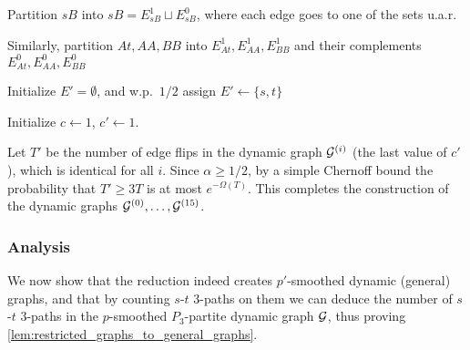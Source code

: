 \documentclass[letter,11pt]{article}
\newcommand{\paths}[3]{${#1}$-${#2}$ ${#3}$-paths\xspace}
\newcommand{\ptg}{\textsc{P3toGeneral}\xspace}
\begin{document}
\begin{algorithm}[H]\DontPrintSemicolon
	\caption{Algorithm \ptg for counting paths in a general graph by counting them in $P_3$-partite graphs}
	
	\nl
	Partition $sB$ into $sB= E_{sB}^1 \sqcup E_{sB}^0$, where each edge goes to one of the sets u.a.r.
	
	\nl
	Similarly, partition $At, AA, BB$ into $E_{At}^1, E_{AA}^1, E_{BB}^1$ and their complements $E_{At}^0, E_{AA}^0, E_{BB}^0$
	
	
	\nl
	Initialize $E'=\emptyset$, and w.p.~$1/2$ assign $E'\gets \{s,t\}$
	
	\nl
	
	\nl Initialize $c\gets1$, $c'\gets 1$. 
	
	\nl
\end{algorithm}

Let $T'$ be the number of edge flips in the dynamic graph $\mathcal{G}^{(i)}$ (the last value of $c'$), which is identical for all $i$.
Since $\alpha \geq 1/2$, by a simple Chernoff bound the probability that $T' \geq 3T$ is at most $e^{-\Omega(T)}$.
This completes the construction of the dynamic graphs $\mathcal{G}^{(0)}, \dots, \mathcal{G}^{(15)}$.

\subsubsection{Analysis}
We now show that the reduction indeed creates 
$p'$-smoothed dynamic (general) graphs, 
and that by counting \paths{s}{t}{3} on them we can deduce the number of \paths{s}{t}{3}
in the $p$-smoothed $P_3$-partite dynamic graph $\mathcal{G}$,
thus proving \cref{lem:restricted_graphs_to_general_graphs}.
\end{document}
